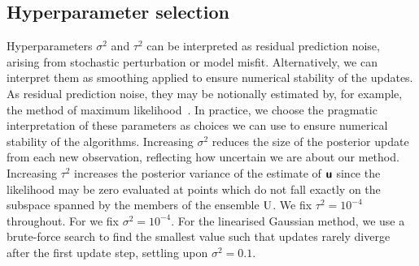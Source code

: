\subsection{Hyperparameter selection}\label{sec:HyperparamSelection}
Hyperparameters \(\sigma^2\) and \(\tau^2\) can be interpreted as residual prediction noise, arising from stochastic perturbation or model misfit.
Alternatively, we can interpret them as smoothing applied to ensure numerical stability of the updates.
As residual prediction noise, they may be notionally estimated by, for example, the method of maximum likelihood~\citep{MitchellAdaptive2000}.
In practice, we choose the pragmatic interpretation of these parameters as choices we can use to ensure numerical stability of the algorithms.
Increasing \(\sigma^2\) reduces the size of the posterior update from each new observation, reflecting how uncertain we are about our method.
Increasing \(\tau^2\) increases the posterior variance of the estimate of \(\boldsymbol{\mathsf{u}}\) since the likelihood may be zero evaluated at points which do not fall exactly on the subspace spanned by the members of the ensemble \(\mathrm{U}\).
We fix \(\tau^2=10^{-4}\) throughout.
For \meth{} we fix \(\sigma^2=10^{-4}\).
For the linearised Gaussian method, we use a brute-force search to find the smallest value such that updates rarely diverge after the first update step, settling upon \(\sigma^2=0.1\).


